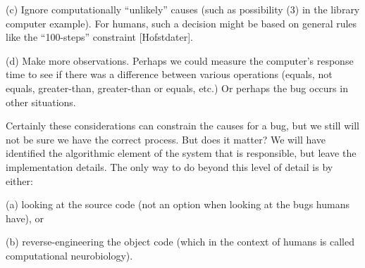     (c) Ignore computationally ``unlikely'' causes (such as possibility (3)
        in the library computer example).  For humans, such a decision
        might be based on general rules like the ``100-steps'' constraint
        [Hofstdater].

    (d) Make more observations.  Perhaps we could measure the computer's
        response time to see if there was a difference between various
        operations (equals, not equals, greater-than, greater-than or
        equals, etc.) Or perhaps the bug occurs in other situations.

Certainly these considerations can constrain the causes for a bug, but we
still will not be sure we have the correct process.  But does it matter? We
will have identified the algorithmic element of the system that is
responsible, but leave the implementation details. The only way to do
beyond this level of detail is by either:

    (a) looking at the source code (not an option when looking at the bugs
        humans have), or

    (b) reverse-engineering the object code (which in the context of humans
        is called computational neurobiology).
